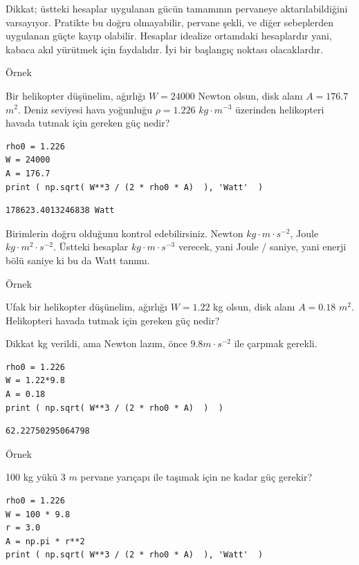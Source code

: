 \documentclass[12pt,fleqn]{article}\usepackage{../../common}
\begin{document}
Dikkat; üstteki hesaplar uygulanan gücün tamamının pervaneye
aktarılabildiğini varsayıyor. Pratikte bu doğru olmayabilir, pervane şekli,
ve diğer sebeplerden uygulanan güçte kayıp olabilir. Hesaplar idealize
ortamdaki hesaplardır yani, kabaca akıl yürütmek için faydalıdır. İyi bir
başlangıç noktası olacaklardır.

Örnek

Bir helikopter düşünelim, ağırlığı $W = 24000$ Newton olsun, disk alanı
$A = 176.7$ $m^2$. Deniz seviyesi hava yoğunluğu $\rho = 1.226$
$kg \cdot m^{-3}$ üzerinden helikopteri havada tutmak için gereken güç
nedir?

\begin{verbatim}
rho0 = 1.226
W = 24000
A = 176.7
print ( np.sqrt( W**3 / (2 * rho0 * A)  ), 'Watt'  )  
\end{verbatim}

\begin{verbatim}
178623.4013246838 Watt
\end{verbatim}

Birimlerin doğru olduğunu kontrol edebilirsiniz. Newton $kg \cdot m \cdot
s^{-2}$, Joule $kg \cdot m^2 \cdot s^{-2}$. Üstteki hesaplar $kg \cdot m
\cdot s^{-3}$ verecek, yani Joule / saniye, yani enerji bölü saniye ki bu
da Watt tanımı. 

Örnek

Ufak bir helikopter düşünelim, ağırlığı $W = 1.22$ kg olsun, disk alanı
$A = 0.18$ $m^2$. Helikopteri havada tutmak için gereken güç nedir?

Dikkat kg verildi, ama Newton lazım, önce $9.8 m \cdot s^{-2}$ ile çarpmak gerekli.

\begin{verbatim}
rho0 = 1.226
W = 1.22*9.8
A = 0.18
print ( np.sqrt( W**3 / (2 * rho0 * A)  )  )  
\end{verbatim}

\begin{verbatim}
62.22750295064798
\end{verbatim}

Örnek

100 kg yükü 3 $m$ pervane yarıçapı ile taşımak için ne kadar güç gerekir?

\begin{verbatim}
rho0 = 1.226
W = 100 * 9.8
r = 3.0
A = np.pi * r**2
print ( np.sqrt( W**3 / (2 * rho0 * A)  ), 'Watt'  ) 
\end{verbatim}
\end{document}
